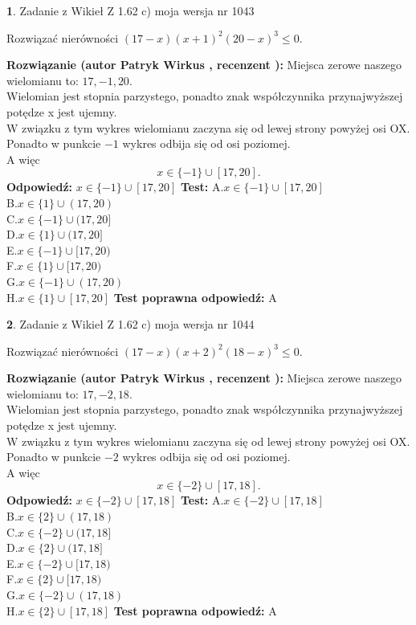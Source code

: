 \documentclass[12pt, a4paper]{article}
\theoremstyle{definition} %
\newtheorem{zad}{}
\newcommand{\zadStart}[1]{\begin{zad}#1\newline}
\newcommand{\zadStop}{\end{zad}}
\newcommand{\rozwStart}[2]{\noindent \textbf{Rozwiązanie (autor #1 , recenzent #2): }\newline}
\newcommand{\rozwStop}{\newline}
\newcommand{\odpStart}{\noindent \textbf{Odpowiedź:}\newline}
\newcommand{\odpStop}{\newline}
\newcommand{\testStart}{\noindent \textbf{Test:}\newline}
\newcommand{\testStop}{\newline}
\newcommand{\kluczStart}{\noindent \textbf{Test poprawna odpowiedź:}\newline}
\newcommand{\kluczStop}{\newline}
\begin{document}
\zadStart{Zadanie z Wikieł Z 1.62 c) moja wersja nr 1043}

Rozwiązać nierówności $(17-x)(x+1)^{2}(20-x)^{3}\le0$.
\zadStop
\rozwStart{Patryk Wirkus}{}
Miejsca zerowe naszego wielomianu to: $17, -1, 20$.\\
Wielomian jest stopnia parzystego, ponadto znak współczynnika przy\linebreak najwyższej potędze x jest ujemny.\\ W związku z tym wykres wielomianu zaczyna się od lewej strony powyżej osi OX.\\
Ponadto w punkcie $-1$ wykres odbija się od osi poziomej.\\
A więc $$x \in \{-1\} \cup [17,20].$$
\rozwStop
\odpStart
$x \in \{-1\} \cup [17,20]$
\odpStop
\testStart
A.$x \in \{-1\} \cup [17,20]$\\
B.$x \in \{1\} \cup (17,20)$\\
C.$x \in \{-1\} \cup (17,20]$\\
D.$x \in \{1\} \cup (17,20]$\\
E.$x \in \{-1\} \cup [17,20)$\\
F.$x \in \{1\} \cup [17,20)$\\
G.$x \in \{-1\} \cup (17,20)$\\
H.$x \in \{1\} \cup [17,20]$
\testStop
\kluczStart
A
\kluczStop



\zadStart{Zadanie z Wikieł Z 1.62 c) moja wersja nr 1044}

Rozwiązać nierówności $(17-x)(x+2)^{2}(18-x)^{3}\le0$.
\zadStop
\rozwStart{Patryk Wirkus}{}
Miejsca zerowe naszego wielomianu to: $17, -2, 18$.\\
Wielomian jest stopnia parzystego, ponadto znak współczynnika przy\linebreak najwyższej potędze x jest ujemny.\\ W związku z tym wykres wielomianu zaczyna się od lewej strony powyżej osi OX.\\
Ponadto w punkcie $-2$ wykres odbija się od osi poziomej.\\
A więc $$x \in \{-2\} \cup [17,18].$$
\rozwStop
\odpStart
$x \in \{-2\} \cup [17,18]$
\odpStop
\testStart
A.$x \in \{-2\} \cup [17,18]$\\
B.$x \in \{2\} \cup (17,18)$\\
C.$x \in \{-2\} \cup (17,18]$\\
D.$x \in \{2\} \cup (17,18]$\\
E.$x \in \{-2\} \cup [17,18)$\\
F.$x \in \{2\} \cup [17,18)$\\
G.$x \in \{-2\} \cup (17,18)$\\
H.$x \in \{2\} \cup [17,18]$
\testStop
\kluczStart
A
\kluczStop
\end{document}
